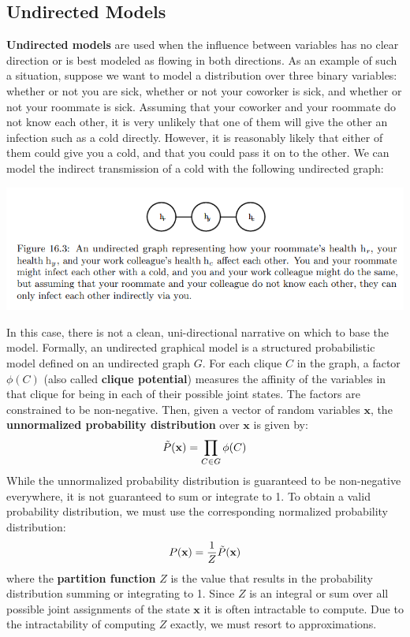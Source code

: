 \subsection{Undirected Models}
\textbf{Undirected models} are used when the influence between variables has no clear direction or is best modeled as flowing in both directions.\newline\newline
As an example of such a situation, suppose we want to model a distribution over three binary variables: whether or not you are sick, whether or not your coworker is sick, and whether or not your roommate is sick. Assuming that your coworker and your roommate do not know each other, it is very unlikely that one of them will give the other an infection such as a cold directly. However, it is reasonably likely that either of them could give you a cold, and that you could pass it on to the other. We can model the indirect transmission of a cold with the following undirected graph:
\begin{center}
    \includegraphics[scale=0.8]{images/undirected models.png}
\end{center}
In this case, there is not a clean, uni-directional narrative on which to base the model.\newline\newline
Formally, an undirected graphical model is a structured probabilistic model defined on an undirected graph $G$. For each clique $C$ in the graph, a factor $\phi(C)$ (also called \textbf{clique potential})  measures the affinity of the variables in that clique for being in each of their possible joint states. The factors are constrained to be
non-negative.\newline\newline
Then, given a vector of random variables $\textbf{x}$, the \textbf{unnormalized probability distribution} over $\textbf{x}$ is given by:
\[\Tilde{P}(\textbf{x}) = \prod_{C \in G}\phi(C)\]
While the unnormalized probability distribution is guaranteed to be non-negative everywhere, it is not guaranteed to sum or integrate to 1. To obtain a valid probability distribution, we must use the corresponding normalized probability distribution:
\[P(\textbf{x}) = \frac{1}{Z}\Tilde{P}(\textbf{x})\]
where the \textbf{partition function} $Z$ is the value that results in the probability distribution summing or integrating to 1. Since $Z$ is an integral or sum over all possible joint assignments of the state $\textbf{x}$
it is often intractable to compute. Due to the intractability of computing $Z$ exactly, we must resort to approximations.

